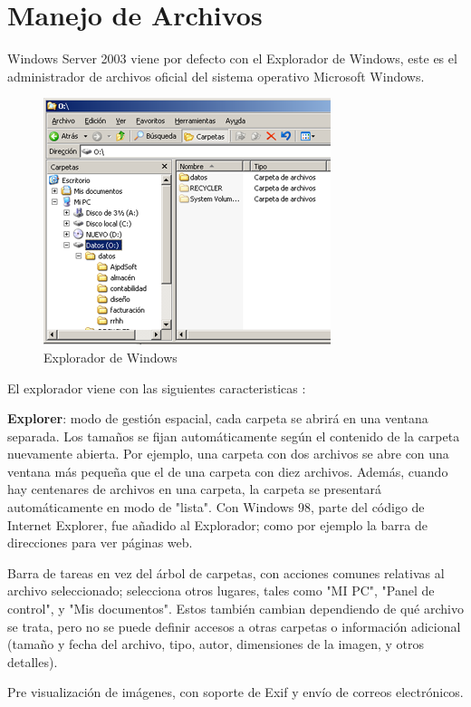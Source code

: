 \documentclass[paper=a4, fontsize=12pt]{article} 		%
\numberwithin{equation}{section}						%
\numberwithin{table}{section} 							%
\begin{document}
\section{Manejo de Archivos}
Windows Server 2003 viene por defecto con el Explorador de Windows, este es el administrador de archivos oficial del sistema operativo Microsoft Windows.
\begin{center}
\begin{figure}[H]
\includegraphics[]{imgs/explorer.png}
\caption{Explorador de Windows}
\label{fig:files}
\end{figure}
\end{center}

El explorador viene con las siguientes caracteristicas : 

\textbf{Explorer}: modo de gestión espacial, cada carpeta se abrirá en una ventana separada. Los tamaños se fijan automáticamente según el contenido de la carpeta nuevamente abierta. Por ejemplo, una carpeta con dos archivos se abre con una ventana más pequeña que el de una carpeta con diez archivos. Además, cuando hay centenares de archivos en una carpeta, la carpeta se presentará automáticamente en modo de "lista".
Con Windows 98, parte del código de Internet Explorer, fue añadido al Explorador; como por ejemplo la barra de direcciones para ver páginas web. 

Barra de tareas en vez del árbol de carpetas, con acciones comunes relativas al archivo seleccionado; selecciona otros lugares, tales como "MI PC", "Panel de control", y "Mis documentos". Estos también cambian dependiendo de qué archivo se trata, pero no se puede definir accesos a otras carpetas o información adicional (tamaño y fecha del archivo, tipo, autor, dimensiones de la imagen, y otros detalles).

Pre visualización de imágenes, con soporte de Exif y envío de correos electrónicos.
\end{document}
